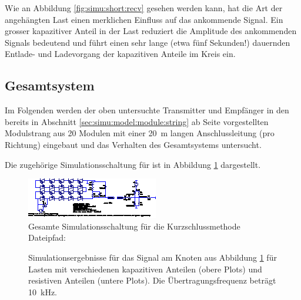 Wie  an  Abbildung  \ref{fig:simu:short:recv}  gesehen werden  kann,  hat  die
Art  der  angeh\"angten Last  einen  merklichen  Einfluss auf  das  ankommende
Signal. Ein grosser kapazitiver Anteil in der Last reduziert die Amplitude des
ankommenden  Signals  bedeutend und  f\"uhrt  einen  sehr lange  (etwa  f\"unf
Sekunden!) dauernden Entlade- und Ladevorgang der kapazitiven Anteile im Kreis
ein.


\clearpage
\subsection{Gesamtsystem}
\label{subsec:simu:ask:total}


Im  Folgenden   werden  der  oben  untersuchte   Transmitter  und  Empf\"anger
in  den  bereits  in  Abschnitt  \ref{sec:simu:model:module:string}  ab  Seite
\pageref{sec:simu:model:module:string}   vorgestellten   Modulstrang  aus   20
Modulen  mit  einer  \SI{20}{\meter} langen  Anschlussleitung  (pro  Richtung)
eingebaut und das Verhalten des Gesamtsystems untersucht.

Die zugeh\"orige  Simulationsschaltung f\"ur   ist  in Abbildung
\ref{fig:ltspice:shortcircuit:complete} dargestellt.

\begin{figure}[h!tb]
    \includegraphics[width=\textwidth]{images/ltspice/jac/shortcircuit.eps}
    \caption[-Schaltung f\"ur Kurzschlussmethode, Modulstrang]
    {%
        Gesamte Simulationsschaltung f\"ur die Kurzschlussmethode\protect\\
        Dateipfad: %
    }
    \label{fig:ltspice:shortcircuit:complete}
\end{figure}

\begin{figure}[h!tb]
    \centering
    
    \caption[Simulationsergebnisse Kurzschlussmethode]{%
        Simulationsergebnisse  f\"ur  das  Signal  am  Knoten  
        aus  Abbildung  \ref{fig:ltspice:shortcircuit:complete}  f\"ur  Lasten
        mit   verschiedenen    kapazitiven   Anteilen       (obere
        Plots)  und  resistiven   Anteilen    (untere  Plots). Die
        \"Ubertragungsfrequenz betr\"agt \SI{10}{\kilo\hertz}.%
    }
    \label{fig:simu:short:complete}
\end{figure}

